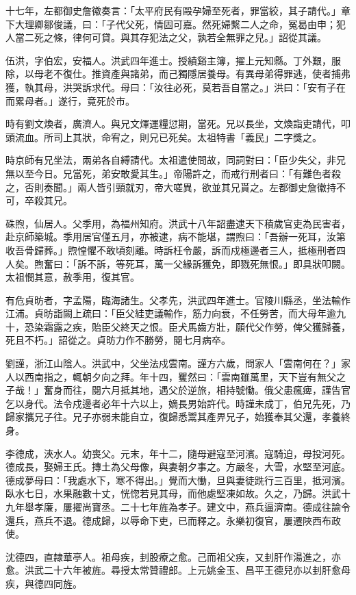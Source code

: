 \begin{pinyinscope}
十七年，左都御史詹徽奏言：「太平府民有毆孕婦至死者，罪當絞，其子請代。」章下大理卿鄒俊議，曰：「子代父死，情固可嘉。然死婦繫二人之命，冤曷由申；犯人當二死之條，律何可貸。與其存犯法之父，孰若全無罪之兒。」詔從其議。

伍洪，字伯宏，安福人。洪武四年進士。授績谿主簿，擢上元知縣。丁外艱，服除，以母老不復仕。推資產與諸弟，而己獨隱居養母。有異母弟得罪逃，使者捕弗獲，執其母，洪哭訴求代。母曰：「汝往必死，莫若吾自當之。」洪曰：「安有子在而累母者。」遂行，竟死於市。

時有劉文煥者，廣濟人。與兄文煇運糧愆期，當死。兄以長坐，文煥詣吏請代，叩頭流血。所司上其狀，命宥之，則兄已死矣。太祖特書「義民」二字獎之。

時京師有兄坐法，兩弟各自縛請代。太祖遣使問故，同詞對曰：「臣少失父，非兄無以至今日。兄當死，弟安敢愛其生。」帝陽許之，而戒行刑者曰：「有難色者殺之，否則奏聞。」兩人皆引頸就刃，帝大嗟異，欲並其兄貰之。左都御史詹徽持不可，卒殺其兄。

硃煦，仙居人。父季用，為福州知府。洪武十八年詔盡逮天下積歲官吏為民害者，赴京師築城。季用居官僅五月，亦被逮，病不能堪，謂煦曰：「吾辦一死耳，汝第收吾骨歸葬。」煦惶懼不敢頃刻離。時訴枉令嚴，訴而戍極邊者三人，抵極刑者四人矣。煦奮曰：「訴不訴，等死耳，萬一父緣訴獲免，即戮死無恨。」即具狀叩闕。太祖憫其意，赦季用，復其官。

有危貞昉者，字孟陽，臨海諸生。父孝先，洪武四年進士。官陵川縣丞，坐法輸作江浦。貞昉詣闕上疏曰：「臣父絓吏議輸作，筋力向衰，不任勞苦，而大母年逾九十，恐染霜露之疾，貽臣父終天之恨。臣犬馬齒方壯，願代父作勞，俾父獲歸養，死且不朽。」詔從之。貞昉力作不勝勞，閱七月病卒。

劉謹，浙江山陰人。洪武中，父坐法戍雲南。謹方六歲，問家人「雲南何在？」家人以西南指之，輒朝夕向之拜。年十四，矍然曰：「雲南雖萬里，天下豈有無父之子哉！」奮身而往，閱六月抵其地，遇父於逆旅，相持號慟。俄父患瘋痺，謹告官乞以身代。法令戍邊者必年十六以上，嫡長男始許代。時謹未成丁，伯兄先死，乃歸家攜兄子往。兄子亦弱未能自立，復歸悉鬻其產畀兄子，始獲奉其父還，孝養終身。

李德成，浹水人。幼喪父。元末，年十二，隨母避寇至河濱。寇騎迫，母投河死。德成長，娶婦王氏。摶土為父母像，與妻朝夕事之。方嚴冬，大雪，水堅至河底。德成夢母曰：「我處水下，寒不得出。」覺而大慟，旦與妻徒跣行三百里，抵河濱。臥水七日，水果融數十丈，恍惚若見其母，而他處堅凍如故。久之，乃歸。洪武十九年舉孝廉，屢擢尚寶丞。二十七年旌為孝子。建文中，燕兵逼濟南。德成往諭令還兵，燕兵不退。德成歸，以辱命下吏，已而釋之。永樂初復官，屢遷陜西布政使。

沈德四，直隸華亭人。祖母疾，刲股療之愈。己而祖父疾，又刲肝作湯進之，亦愈。洪武二十六年被旌。尋授太常贊禮郎。上元姚金玉、昌平王德兒亦以刲肝愈母疾，與德四同旌。


\end{pinyinscope}

